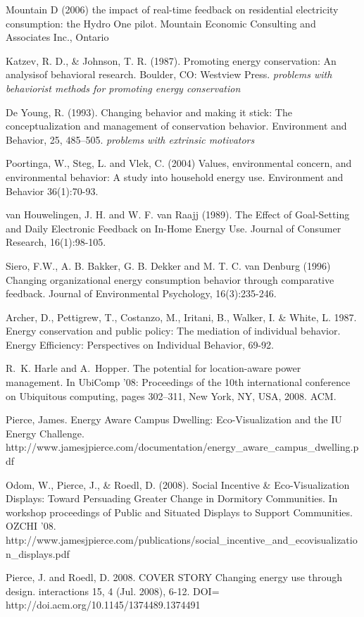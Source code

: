 Mountain D (2006) the impact of real-time feedback on residential electricity consumption: the Hydro One pilot. Mountain Economic Consulting and Associates Inc., Ontario

Katzev, R. D., \& Johnson, T. R. (1987). Promoting energy conservation: An analysisof behavioral research. Boulder, CO: Westview Press. \emph{problems with behaviorist methods for promoting energy conservation}

De Young, R. (1993). Changing behavior and making it stick: The conceptualization and management of conservation behavior. Environment and Behavior, 25, 485–505. \emph{problems with extrinsic motivators}

Poortinga, W., Steg, L. and Vlek, C. (2004) Values, environmental concern, and environmental behavior: A study into household energy use. Environment and Behavior 36(1):70-93.  

van Houwelingen, J. H. and W. F. van Raajj (1989). The Effect of Goal-Setting and Daily Electronic Feedback on In-Home Energy Use. Journal of Consumer Research, 16(1):98-105.

Siero, F.W., A. B. Bakker, G. B. Dekker and M. T. C. van Denburg (1996) Changing organizational energy consumption behavior through comparative feedback. Journal of Environmental Psychology, 16(3):235-246.

Archer, D., Pettigrew, T., Costanzo, M., Iritani, B., Walker, I. & White, L. 1987. Energy conservation and public policy: The mediation of individual behavior. Energy Efficiency: Perspectives on Individual Behavior, 69-92.

R. K. Harle and A. Hopper. The potential for location-aware power management. In UbiComp ’08: Proceedings of the 10th international conference on Ubiquitous computing, pages 302–311, New York, NY, USA, 2008. ACM.

Pierce, James. Energy Aware Campus Dwelling: Eco-Visualization and the IU Energy Challenge. http://www.jamesjpierce.com/documentation/energy_aware_campus_dwelling.pdf

Odom, W., Pierce, J., & Roedl, D. (2008). Social Incentive & Eco-Visualization Displays: Toward Persuading Greater Change in Dormitory Communities. In workshop proceedings of Public and Situated Displays to Support Communities. OZCHI '08. http://www.jamesjpierce.com/publications/social_incentive_and_ecovisualization_displays.pdf

Pierce, J. and Roedl, D. 2008. COVER STORY
Changing energy use through design. interactions 15, 4 (Jul. 2008), 6-12. DOI= http://doi.acm.org/10.1145/1374489.1374491

